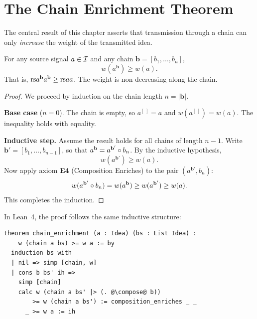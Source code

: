 \section{The Chain Enrichment Theorem}

The central result of this chapter asserts that transmission through a chain
can only \emph{increase} the weight of the transmitted idea.

\begin{theorem}
\label{thm:chain-enrichment}
For any source signal $a \in \mathcal{I}$ and any chain
$\mathbf{b} = [b_1, \ldots, b_n]$,
\[
  w(a^{\mathbf{b}}) \geq w(a).
\]
That is, $\mathrm{rs}{a^{\mathbf{b}}}{a^{\mathbf{b}}} \geq \mathrm{rs}{a}{a}$.  The weight
is non-decreasing along the chain.
\end{theorem}

\begin{proof}
We proceed by induction on the chain length $n = |\mathbf{b}|$.

\textbf{Base case} ($n = 0$).  The chain is empty, so $a^{[~]} = a$ and
$w(a^{[~]}) = w(a)$.  The inequality holds with equality.

\textbf{Inductive step.}  Assume the result holds for all chains of length
$n - 1$.  Write
$\mathbf{b}' = [b_1, \ldots, b_{n-1}]$, so that
$a^{\mathbf{b}} = a^{\mathbf{b}'} \circ b_n$.
By the inductive hypothesis,
\[
  w(a^{\mathbf{b}'}) \geq w(a).
\]
Now apply axiom \textbf{E4} (Composition Enriches) to the pair
$(a^{\mathbf{b}'}, b_n)$:
\[
  w(a^{\mathbf{b}'} \circ b_n)
  = w(a^{\mathbf{b}})
  \geq w(a^{\mathbf{b}'})
  \geq w(a).
\]
This completes the induction.
\end{proof}

In Lean~4, the proof follows the same inductive structure:

\begin{lstlisting}
theorem chain_enrichment (a : Idea) (bs : List Idea) :
    w (chain a bs) >= w a := by
  induction bs with
  | nil => simp [chain, w]
  | cons b bs' ih =>
    simp [chain]
    calc w (chain a bs' |> (. @\compose@ b))
        >= w (chain a bs') := composition_enriches _ _
      _ >= w a := ih
\end{lstlisting}

